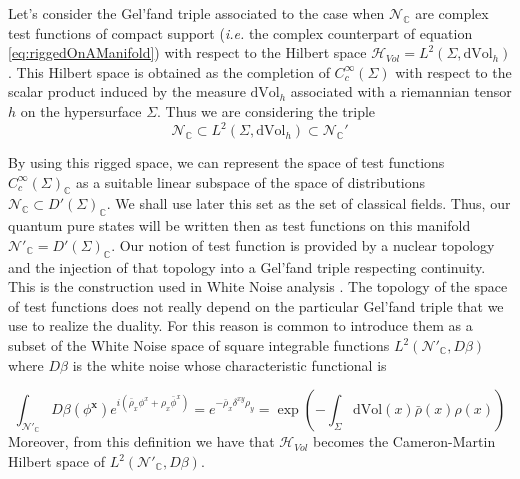 \documentclass[12pt]{article}%
\begin{document}
 Let's consider the Gel'fand triple associated to the case when $\mathcal{N}_{\mathbb{C}}$ are complex test functions of compact support ({\it i.e.} the complex counterpart of equation \eqref{eq:riggedOnAManifold}) with respect to the Hilbert space $\mathcal{H}_{Vol}=L^2(\Sigma,\mathrm{dVol}_h)$. This Hilbert space is  obtained as the completion of $C^\infty_c(\Sigma)$ with respect to the scalar product induced by the measure $\mathrm{dVol}_h$ associated with a riemannian tensor $h$ on the hypersurface $\Sigma$. Thus we are considering the triple 
\begin{equation}
    \label{eq:riggedOnAManifoldcomp}
    \mathcal{N}_{\mathbb{C}}\subset L^2(\Sigma,\mathrm{dVol}_h) \subset \mathcal{N}_{\mathbb{C}}'
    \end{equation}

By using this rigged space, we can represent the space of test functions $C^\infty_c(\Sigma)_{\mathbb{C}}$ as a suitable linear subspace of the space of distributions $\mathcal{N}_{\mathbb{C}}\subset D'(\Sigma)_{\mathbb{C}}$. We shall use later this set as the set of classical fields.  Thus, our quantum pure states will be written then as test functions on this manifold $\mathcal{N}'_{\mathbb{C}}=D'(\Sigma)_{\mathbb{C}}$. Our notion of test function is provided by a nuclear topology and the injection of that topology into a Gel'fand triple respecting continuity.  This is the construction used in White Noise analysis \cite{Hida1993,Holden2010,Wester2003}. The topology of the space of test functions does not really depend on the particular Gel'fand triple that we use to realize the duality. For this reason is common to introduce them as a subset of the White Noise space of square integrable functions $L^2(\mathcal{N}'_{\mathbb{C}},D\beta)$ where $D\beta$ is the white noise whose characteristic functional is

\begin{equation}
\label{eq:whiteNoise}
\int_{\mathcal{N}'_{\mathbb{C}}}D\beta(\phi^\mathbf{x}) e^{i(\bar\rho_x\phi^x+\rho_x\bar\phi^x)}= e^{-\bar\rho_x\delta^{xy}\rho_y}=\exp\left(-\int_\Sigma \textrm{dVol}(x)\bar\rho(x)\rho(x)\right)
\end{equation}
Moreover, from this definition we have that $\mathcal{H}_{Vol}$ becomes the Cameron-Martin Hilbert space of $L^2(\mathcal{N}'_{\mathbb{C}},D\beta)$.
\end{document}
